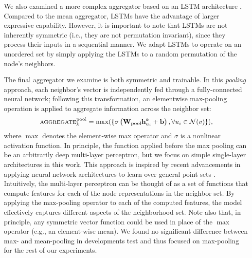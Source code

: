  We also examined a more complex aggregator based on an LSTM architecture \cite{hochreiter1997long}. 
Compared to the mean aggregator, LSTMs have the advantage of larger expressive capability. However, it is important to note that LSTMs are not inherently symmetric (i.e., they are not permutation invariant), since they process their inputs in a sequential manner.
We adapt LSTMs to operate on an unordered set by simply applying the LSTMs to a random permutation of the node's neighbors. 

 The final aggregator we examine is both symmetric and trainable.
In this {\em pooling} approach, each neighbor's vector is independently fed through a fully-connected neural network; following this transformation, an elementwise max-pooling operation is applied to aggregate information across the neighbor set:
\begin{equation}\label{eq:pool}
\textsc{aggregate}_k^{\textrm{pool}} = \max(\{\sigma\left(\mathbf{W}_{\textrm{pool}}\mathbf{h}^k_{u_i} + \mathbf{b}\right), \forall u_i \in \mathcal{N}(v)\}),
\end{equation}
where $\max$ denotes the element-wise max operator and $\sigma$ is a nonlinear activation function. 
In principle, the function applied before the max pooling can be an arbitrarily deep multi-layer perceptron, but we focus on simple single-layer architectures in this work. 
This approach is inspired by recent advancements in applying neural network architectures to learn over general point sets \cite{qi2016pointnet}.
Intuitively, the multi-layer perceptron can be thought of as a set of functions that compute features for each of the node representations in the neighbor set. By applying the max-pooling operator to each of the computed features, the model effectively captures different aspects of the neighborhood set. 
Note also that, in principle, any symmetric vector function could be used in place of the $\max$ operator (e.g., an element-wise mean). 
We found no significant difference between max- and mean-pooling in developments test and thus focused on max-pooling for the rest of our experiments. 

